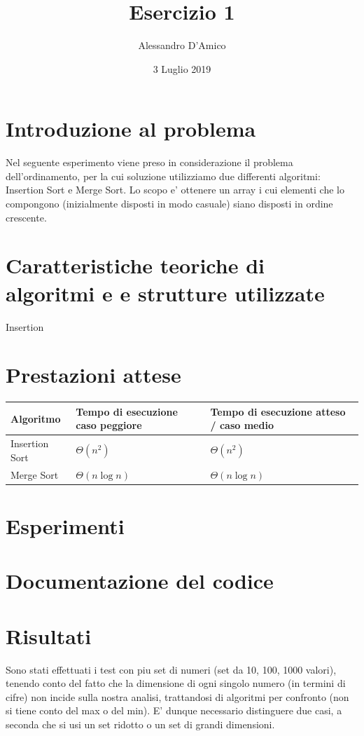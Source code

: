 \documentclass[a4paper]{article}
\title {{\TitleFont Esercizio 1}}
\date{3 Luglio 2019}
\author{{\AuthFont Alessandro D'Amico}}
\begin{document}
\begin{titlingpage}
\maketitle
\end{titlingpage}
\tableofcontents
\newpage
\section{Introduzione al problema}
Nel seguente esperimento viene preso in considerazione il problema dell'ordinamento, per la cui soluzione utilizziamo due differenti algoritmi: Insertion Sort e Merge Sort.
Lo scopo e' ottenere un array i cui elementi che lo compongono (inizialmente disposti in modo casuale) siano disposti in ordine crescente.
\section{Caratteristiche teoriche di algoritmi e e strutture utilizzate}
Insertion
\section{Prestazioni attese}
	\begin{tabularx}{8cm}{|X|X|X|}
	\hline
	Algoritmo & Tempo di esecuzione caso peggiore & Tempo di esecuzione atteso / caso medio \\
	\hline
	Insertion Sort & $\Theta(n^2)$  & $\Theta(n^2)$ \\
	\hline
	Merge Sort &  $\Theta(n\log{}n)$ & $\Theta(n\log{}n)$\\
	\hline
	\end{tabularx}
\section{Esperimenti}
\section{Documentazione del codice}
\newpage
\section{Risultati}
Sono stati effettuati i test con piu set di numeri (set da 10, 100, 1000 valori), tenendo conto del fatto che la dimensione di ogni singolo numero (in termini di cifre) non incide sulla nostra analisi, trattandosi di algoritmi per confronto (non si tiene conto del max o del min). E' dunque necessario distinguere due casi, a seconda che si usi un set ridotto o un set di grandi dimensioni. 
\end{document}

